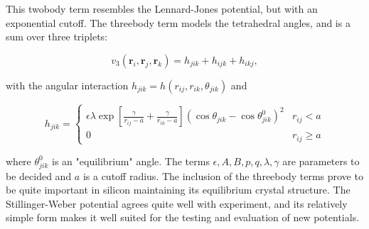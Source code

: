 This twobody term resembles the Lennard-Jones potential,
but with an exponential cutoff.
The threebody term models the tetrahedral angles,
and is a sum over three triplets:

\begin{equation}
    v_3(\bm{r}_i, \bm{r}_j, \bm{r}_k) = h_{jik} + h_{ijk} + h_{ikj} ,
\end{equation}

with the angular interaction $h_{jik} = h(r_{ij}, r_{ik}, \theta_{jik})$ and

\begin{equation}
    h_{jik} =
    \begin{cases}
        \displaystyle\epsilon \lambda \exp \left[ \frac{\gamma}{r_{ij} - a}
        + \frac{\gamma}{r_{ik} - a} \right]
        \left(\cos{\theta_{jik}} - \cos{\theta_{jik}^0} \right)^2 & r_{ij} < a \\[10pt]
        \displaystyle 0 & r_{ij} \geq a
    \end{cases}
\end{equation}

where $\theta_{jik}^0$ is an "equilibrium" angle.
The terms $\epsilon, A, B, p, q, \lambda, \gamma$ are parameters
to be decided and $a$ is a cutoff radius.
The inclusion of the threebody terms prove to be quite important
in silicon maintaining its equilibrium crystal structure.
The Stillinger-Weber potential agrees quite well with experiment,
and its relatively simple form makes it well suited for
the testing and evaluation of new potentials.
